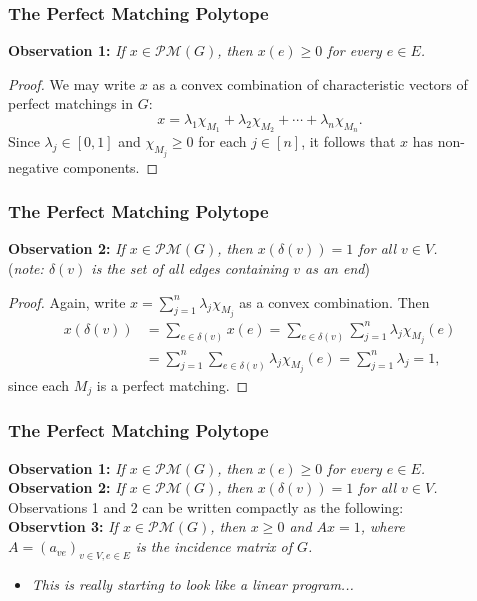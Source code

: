 \begin{frame}
\frametitle{The Perfect Matching Polytope}
\textbf{Observation 1:} \emph{If \( x \in \mathcal{P} \mathcal{M} (G) \), then \( x(e) \geq 0 \) for every \( e \in E \).}
\begin{proof}
	We may write \( x \) as a convex combination of characteristic vectors of perfect matchings in \( G \): \[ x = \lambda_1 \chi_{M_1} + \lambda_2 \chi_{M_2} + \cdots + \lambda_{n} \chi_{M_{n} } . \] Since \( \lambda_{j} \in [0, 1] \) and \( \chi_{M_{j} } \geq 0 \) for each \( j \in [n] \), it follows that \( x \) has non-negative components.
\end{proof}
\end{frame}

\begin{frame}
\frametitle{The Perfect Matching Polytope}
\textbf{Observation 2:} \emph{If \( x \in \mathcal{P} \mathcal{M} (G) \), then \( x(\delta (v)) = 1 \) for all \( v \in V \).}\\
(\emph{note: \( \delta (v) \) is the set of all edges containing \( v \) as an end})
\begin{proof}
Again, write \( x = \sum_{j=1}^{n} \lambda_{j} \chi_{M_{j} }  \) as a convex combination. Then
\begin{align*}
	x(\delta (v)) &= \sum_{e \in \delta (v)}^{} x(e) = \sum_{e \in \delta (v)}^{} \sum_{j=1}^{n} \lambda_{j} \chi_{M_{j} } (e) \\
		      &= \sum_{j=1}^{n} \sum_{e \in \delta (v)}^{} \lambda_{j} \chi_{M_{j} } (e) = \sum_{j=1}^{n} \lambda_{j} = 1,
\end{align*}
since each \( M_{j}  \) is a perfect matching.
\end{proof}
\end{frame}

\begin{frame}
\frametitle{The Perfect Matching Polytope}
\textbf{Observation 1:} \emph{If \( x \in \mathcal{P} \mathcal{M} (G) \), then \( x(e) \geq 0 \) for every \( e \in E \).} \\
\vspace{0.1cm}
\textbf{Observation 2:} \emph{If \( x \in \mathcal{P} \mathcal{M} (G) \), then \( x(\delta (v)) = 1 \) for all \( v \in V \).}\\
\vspace{0.5cm}
Observations 1 and 2 can be written compactly as the following: \\
\vspace{0.1cm}
\textbf{Observtion 3:} \emph{If \( x \in \mathcal{P} \mathcal{M} (G) \), then \( x \geq 0 \) and \( Ax = 1 \), where \( A = (a_{ve})_{v \in V, e \in E}  \) is the incidence matrix of \( G \).}
\begin{itemize}
	\item<2> \emph{This is really starting to look like a linear program...} 
\end{itemize}
\end{frame}

